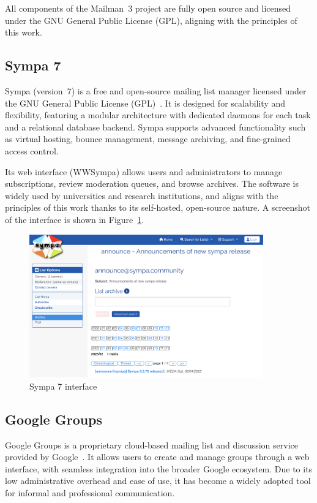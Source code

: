 All components of the Mailman~3 project are fully open source and licensed under the GNU General Public License (GPL), aligning with the principles of this work.

\subsection*{Sympa 7}

Sympa (version~7) is a free and open-source mailing list manager licensed under the GNU General Public License (GPL)~\cite{sympa-docs}. It is designed for scalability and flexibility, featuring a modular architecture with dedicated daemons for each task and a relational database backend. Sympa supports advanced functionality such as virtual hosting, bounce management, message archiving, and fine-grained access control.

Its web interface (WWSympa) allows users and administrators to manage subscriptions, review moderation queues, and browse archives. The software is widely used by universities and research institutions, and aligns with the principles of this work thanks to its self-hosted, open-source nature. A screenshot of the interface is shown in Figure~\ref{fig:sympa}.

\begin{figure}[H]
  \centering
  \includegraphics[width=0.9\textwidth]{imaxes/sympa.png}
  \caption{Sympa 7 interface}
  \label{fig:sympa}
\end{figure}

\subsection*{Google Groups}

Google Groups is a proprietary cloud-based mailing list and discussion service provided by Google~\cite{google-groups-docs}. It allows users to create and manage groups through a web interface, with seamless integration into the broader Google ecosystem. Due to its low administrative overhead and ease of use, it has become a widely adopted tool for informal and professional communication.

